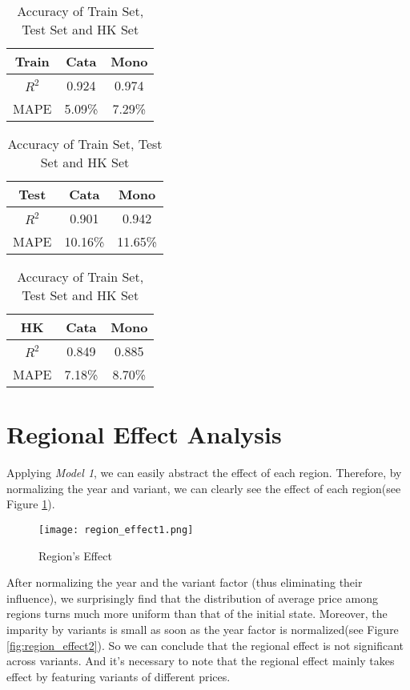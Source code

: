 \documentclass[12pt]{article}  %
\begin{document}
\begin{table}[htbp]
        \centering
        \begin{tabular}{c|c|c}
        Train& Cata& Mono \\
        \hline
        \hline
        $R^2$ & 0.924 & 0.974 \\
        \hline
        MAPE & 5.09\% & 7.29\% \\
        \hline
        \end{tabular}
        \qquad
        \begin{tabular}{c|c|c}
        Test& Cata& Mono \\
        \hline
        \hline
        $R^2$ & 0.901 & 0.942 \\
        \hline
        MAPE & 10.16\% & 11.65\% \\
        \hline
        \end{tabular}
        \qquad
        \begin{tabular}{c|c|c}
        HK& Cata& Mono \\
            \hline
            \hline
            $R^2$ & 0.849 & 0.885 \\
            \hline
            MAPE & 7.18\% & 8.70\% \\
            \hline
            \end{tabular}
        \caption{Accuracy of Train Set, Test Set and HK Set}
        \label{tab:Accuracy}
\end{table}


\section{Regional Effect Analysis}

Applying \emph{Model 1}, we can easily abstract the effect of each region. 
Therefore, by normalizing the year and variant, 
we can clearly see the effect of each region(see Figure \ref{fig:region_effect1}).

\begin{figure}[htbp]
    \centering
    \texttt{[image: region\_effect1.png]}
    \caption{Region's Effect}\label{fig:region_effect1}
\end{figure}

After normalizing the year and the variant factor (thus eliminating their influence), we surprisingly find that the distribution of average price among regions turns much more uniform than that of the initial state. Moreover, the imparity by variants is small as soon as the year factor is normalized(see Figure \ref{fig:region_effect2}). So we can conclude that the regional effect is not significant across variants. And it's necessary to note that the regional effect mainly takes effect by featuring variants of different prices.
\end{document}
